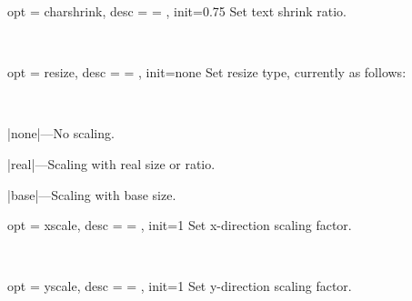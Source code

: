 \documentclass[full]{l3doc}
\begin{document}
\begin{documentation}
\bigskip

\begin{option}{ opt = charshrink, desc = {= }, init=0.75 }
  Set text shrink ratio.
\end{option}\\
\begin{SideBySideExample}[frame=single,numbers=left,xrightmargin=.45\linewidth,gobble=2]
  \centering
  \quad
  \quad
  \quad
\end{SideBySideExample}

\bigskip

\begin{option}{ opt = resize, desc = {= }, init=none }
  Set resize type, currently as follows:
\end{option}\\
\begin{Description}
  \item |none|---No scaling.
  \item |real|---Scaling with real size or ratio.
  \item |base|---Scaling with base size.
\end{Description}
\begin{SideBySideExample}[frame=single,numbers=left,xrightmargin=.45\linewidth,gobble=2]
  \centering
  \quad
  \quad
\end{SideBySideExample}

\bigskip

\begin{option}{ opt = xscale, desc = {= }, init=1 }
  Set x-direction scaling factor.
\end{option}\\
\begin{SideBySideExample}[frame=single,numbers=left,xrightmargin=.45\linewidth,gobble=2]
  \centering
  \quad
  \quad
\end{SideBySideExample}

\bigskip

\begin{option}{ opt = yscale, desc = {= }, init=1 }
  Set y-direction scaling factor.
\end{option}\\
\begin{SideBySideExample}[frame=single,numbers=left,xrightmargin=.45\linewidth,gobble=2]
  \centering
  \quad
  \quad
\end{SideBySideExample}


\end{documentation}
\end{document}
